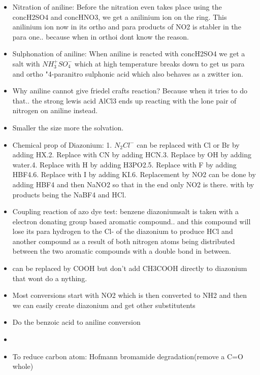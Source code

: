 \documentclass[12pt]{article}
\begin{document}
\begin{itemize}
\item Nitration of aniline: Before the nitration even takes place
using the concH2SO4 and concHNO3, we get a anilinium ion on the
ring. This anilinium ion now in its ortho and para products of NO2
is stabler in the para one.. because when in ortho{i dont know the 
reason.}

\item Sulphonation of aniline: When aniline is reacted with concH2SO4
we get a salt with $NH_{3}^{+}SO_{4}^{-}$ which at high temperature 
breaks down to get us para and ortho "4-paranitro sulphonic acid which 
also behaves as a zwitter ion.

\item Why aniline cannot give friedel crafts reaction? Because when it 
tries to do that.. the strong lewis acid AlCl3 ends up reacting with 
the lone pair of nitrogen on aniline instead.

\item Smaller the size more the solvation.

\item Chemical prop of Diazonium: 1. $N_{2}Cl^{-}$ can be replaced with 
Cl or Br by adding HX.2. Replace with CN by adding HCN.3. Replace by OH 
by adding water.4. Replace with H by adding H3PO2.5. Replace with F by 
adding HBF4.6. Replace with I by adding KI.6. Replacement by NO2 can be 
done by adding HBF4 and then NaNO2 so that in the end only NO2 is there.
with by products being the NaBF4 and HCl.

\item Coupling reaction of azo dye test: benzene diazoniumsalt is taken with
 a electron donating group based aromatic compound.. and this compound will
lose its para hydrogen to the Cl- of the diazonium to produce HCl and another
compound as a result of both nitrogen atoms being distributed between the two 
aromatic compounds with a double bond in between.

\item can be replaced by COOH but don't add CH3COOH directly to diazonium 
that wont do a nything.

\item Most conversions start with NO2 which is then converted to NH2 and then
we can easily create diazonium and get other substitutents

\item Do the benzoic acid to aniline conversion

\item {}

\item To reduce carbon atom: Hofmann bromamide degradation(remove a C=O whole)

\end{itemize}
\end{document}
